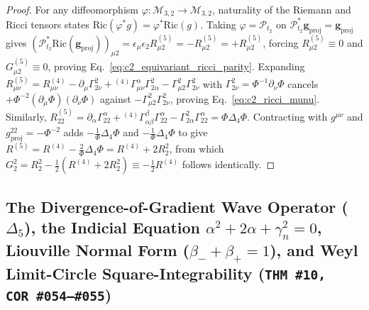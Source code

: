 \documentclass[11pt,a4paper]{article}
\theoremstyle{definition}
\theoremstyle{plain}
\theoremstyle{remark}
\begin{document}
\begin{proof}
For any diffeomorphism $\varphi: \mathcal{M}_{3,2} \to \mathcal{M}_{3,2}$, naturality of the Riemann and Ricci tensors states $\mathrm{Ric}(\varphi^* g) = \varphi^*\mathrm{Ric}(g)$. Taking $\varphi = \mathcal{P}_{t_2}$ on $\mathcal{P}_{t_2}^*\mathbf{g}_{\mathrm{proj}} = \mathbf{g}_{\mathrm{proj}}$ gives $(\mathcal{P}_{t_2}^*\mathrm{Ric}(\mathbf{g}_{\mathrm{proj}}))_{\mu 2} = \epsilon_\mu\epsilon_2 R_{\mu 2}^{(5)} = -R_{\mu 2}^{(5)} = +R_{\mu 2}^{(5)}$, forcing $R_{\mu 2}^{(5)} \equiv 0$ and $G_{\mu 2}^{(5)} \equiv 0$, proving Eq.~\eqref{eq:c2_equivariant_ricci_parity}. Expanding $R_{\mu\nu}^{(5)} = R_{\mu\nu}^{(4)} - \partial_\mu\Gamma^2_{2\nu} + {}^{(4)}\Gamma^\alpha_{\mu\nu}\Gamma^2_{2\alpha} - \Gamma^2_{\mu 2}\Gamma^2_{2\nu}$ with $\Gamma^2_{2\nu} = \Phi^{-1}\partial_\nu\Phi$ cancels $+\Phi^{-2}(\partial_\mu\Phi)(\partial_\nu\Phi)$ against $-\Gamma^2_{\mu 2}\Gamma^2_{2\nu}$, proving Eq.~\eqref{eq:c2_ricci_munu}. Similarly, $R_{22}^{(5)} = \partial_\alpha\Gamma^\alpha_{22} + {}^{(4)}\Gamma^\beta_{\alpha\beta}\Gamma^\alpha_{22} - \Gamma^2_{2\alpha}\Gamma^\alpha_{22} = \Phi\Delta_4\Phi$. Contracting with $g^{\mu\nu}$ and $g^{22}_{\mathrm{proj}} = -\Phi^{-2}$ adds $-\frac{1}{\Phi}\Delta_4\Phi$ and $-\frac{1}{\Phi}\Delta_4\Phi$ to give $R^{(5)} = R^{(4)} - \frac{2}{\Phi}\Delta_4\Phi = R^{(4)} + 2 R^2_2$, from which $G^2_2 = R^2_2 - \frac{1}{2}(R^{(4)} + 2 R^2_2) \equiv -\frac{1}{2}R^{(4)}$ follows identically.
\end{proof}

\subsection{\texorpdfstring{The Divergence-of-Gradient Wave Operator ($\Delta_5$), the Indicial Equation $\alpha^2 + 2\alpha + \gamma_n^2 = 0$, Liouville Normal Form ($\beta_-+\beta_+=1$), and Weyl Limit-Circle Square-Integrability (\texttt{THM~\#10, COR~\#054--\#055})}{The Divergence-of-Gradient Wave Operator, the Indicial Equation, Liouville Normal Form, and Weyl Limit-Circle Square-Integrability}}
\end{document}
